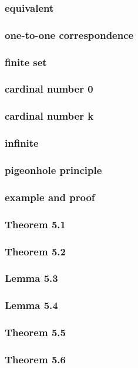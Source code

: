 \documentclass[a4paper]{article}
\begin{document}
\subsubsection*{equivalent}
\subsubsection*{one-to-one correspondence}
\subsubsection*{finite set}
\subsubsection*{cardinal number 0}
\subsubsection*{cardinal number k}
\subsubsection*{infinite}
\subsubsection*{pigeonhole principle}
\subsubsection*{example and proof}
\subsubsection*{Theorem 5.1}
\subsubsection*{Theorem 5.2}
\subsubsection*{Lemma 5.3}
\subsubsection*{Lemma 5.4}
\subsubsection*{Theorem 5.5}
\subsubsection*{Theorem 5.6}
\end{document}
